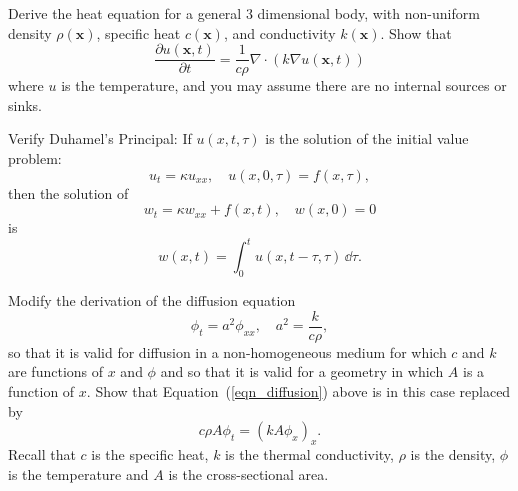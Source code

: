 {%
\begin{Exercise}
  Derive the heat equation for a general
  3 dimensional body, with non-uniform density $\rho(\mathbf{x})$, specific
  heat $c(\mathbf{x})$, and conductivity $k(\mathbf{x})$. Show that
  \[  
  \frac{ \partial u(\mathbf{x},t)}{\partial t} = \frac{1}{c \rho} \nabla \cdot (k \nabla u(\mathbf{x},t)) 
  \]
  where $u$ is the temperature, and you may assume there are no internal 
  sources or sinks. 
\end{Exercise}







\begin{Exercise}
  Verify Duhamel's Principal:  If $u(x,t,\tau)$ is the solution of the initial
  value problem:
  \[
  u_t = \kappa u_{x x}, \quad u(x,0,\tau) = f(x,\tau),
  \]
  then the solution of
  \[
  w_t = \kappa w_{x x} + f(x,t), \quad w(x,0) = 0
  \]
  is
  \[
  w(x,t) = \int_0^t u(x,t-\tau,\tau) \,\dd \tau.
  \]
\end{Exercise}









\begin{Exercise}
  Modify the derivation of the diffusion equation
  \begin{equation}
    \label{eqn_diffusion}
    \phi_t = a^2 \phi_{x x}, \quad a^2 = \frac{k}{c \rho},
  \end{equation}
  so that it is valid for diffusion in a 
  non-homogeneous medium for which $c$ and $k$ are functions of $x$ and $\phi$
  and so that it is valid for a geometry in which $A$ is a function of $x$.
  Show that Equation~(\ref{eqn_diffusion}) above is in this case replaced
  by
  \[
  c \rho A \phi_t = \left( k A \phi_x \right)_x.
  \]
  Recall that $c$ is the specific heat, $k$ is the thermal conductivity,
  $\rho$ is the density, $\phi$ is the temperature and $A$ is the 
  cross-sectional area.
\end{Exercise}







\raggedbottom
}
